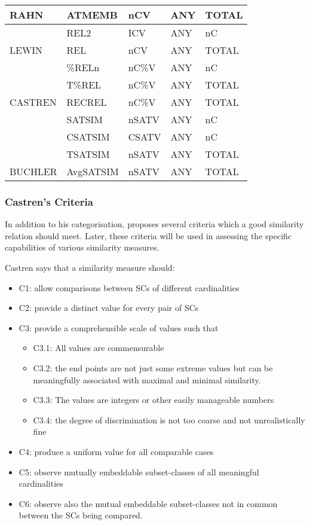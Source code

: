 \documentclass{article}
\begin{document}
\begin{table}[htb]
\begin{center}
\begin{tabular}{lllll}
 RAHN        &  ATMEMB      &  nCV     &  ANY   &  TOTAL    \\
\hline
             &  REL2        &  ICV     &  ANY   &  nC       \\
 LEWIN       &  REL         &  nCV     &  ANY   &  TOTAL    \\
\hline
             &  \%RELn      &  nC\%V   &  ANY   &  nC       \\
             &  T\%REL      &  nC\%V   &  ANY   &  TOTAL    \\
 CASTREN     &  RECREL      &  nC\%V   &  ANY   &  TOTAL    \\
\hline
             &  SATSIM      &  nSATV   &  ANY   &  nC       \\
             &  CSATSIM     &  CSATV   &  ANY   &  nC       \\
             &  TSATSIM     &  nSATV   &  ANY   &  TOTAL    \\
 BUCHLER     &  AvgSATSIM   &  nSATV   &  ANY   &  TOTAL    \\
\hline
\end{tabular}
\end{center}
\end{table}
\subsubsection{Castren's Criteria}
\label{sec-3-4-3}

In addition to his categorisation, \citet{Castren1994} proposes several
criteria which a good similarity relation should meet. Later, these
criteria will be used in assessing the specific capabilities of
various similarity measures. 

Castren says that a similarity measure should:
\begin{itemize}
\item C1: allow comparisons between SCs of different cardinalities
\item C2: provide a distinct value for every pair of SCs
\item C3: provide a comprehensible scale of values such that
\begin{itemize}
\item C3.1: All values are commensurable
\item C3.2: the end points are not just some extreme values but can be
    meaningfully associated with maximal and minimal similarity.
\item C3.3: The values are integers or other easily manageable numbers
\item C3.4: the degree of discrimination is not too coarse and not
    unrealistically fine
\end{itemize}
\item C4: produce a uniform value for all comparable cases
\item C5: observe mutually embeddable subset-classes of all meaningful
  cardinalities
\item C6: observe also the mutual embeddable subset-classes not in common
  between the SCs being compared.
\end{itemize}
\end{document}
